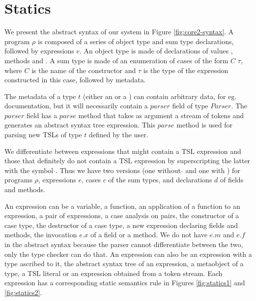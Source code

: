 \section{Statics}


We present the abstract syntax of our system in Figure \ref{fig:core2-syntax}. A program $\rho$ is composed of a series of object type  and sum type  declarations, followed by expressions $e$. An object type is made of declarations of values , methods  and . A sum type is made of an enumeration of cases of the form $C$  $\tau$, where $C$ is the name of the constructor and $\tau$ is the type of the expression constructed in this case, followed by metadata.

The metadata of a type $t$ (either an  or a ) can contain arbitrary data, for eg. documentation, but it will necessarily contain a $parser$ field of type $Parser$. The $parser$ field has a $parse$ method that takes as argument a stream of tokens and generates an abstract syntax tree expression. This $parse$ method is used for parsing new TSLs of type $t$ defined by the user. 

We differentiate between expressions that might contain a TSL expression and those that definitely do not contain a TSL expression by superscripting the latter with the symbol $\hat{}$. Thus we have two versions (one without $\hat{}$ and one with $\hat{}$) for programs $\rho$,  expressions $e$, cases $c$ of the sum types, and declarations $d$ of fields and methods. 

An expression can be a variable, a function, an application of a function to an expression, a pair of expressions, a case analysis on pairs, the constructor of a case type, the destructor of a case type, a new expression declaring fields and methods, the invocation $e.x$ of a field or a method. We do not have $e.m$ and $e.f$ in the abstract syntax because the parser cannot differentiate between the two, only the type checker can do that. An expression can also be an expression with a type ascribed to it, the abstract syntax tree of an expression, a metaobject of a type, a TSL literal or an expression obtained from a token stream. Each expression has a corresponding static semantics rule in Figures \ref{fig:statics1} and \ref{fig:statics2}. 

